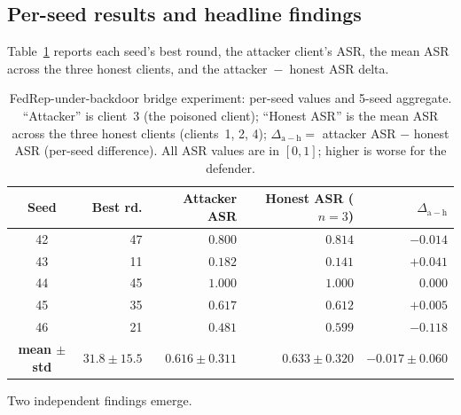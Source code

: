 \documentclass[a4paper,fleqn,doubleblind]{cas-sc}
\newcommand{\tblhead}{\rowcolor{tblHeadBg}}
\newcommand{\zebra}{\rowcolors{2}{tblAltBg}{white}}
\newcommand{\tblhead}{}
\newcommand{\zebra}{}
\begin{document}
\subsection{Per-seed results and headline findings}
\label{sec:bridge-results}

Table~\ref{tab:bridge} reports each seed's best round, the attacker
client's ASR, the mean ASR across the three honest clients, and the
attacker~$-$~honest ASR delta.

\begin{table}[pos=tbp]
\centering
\footnotesize
\setlength{\tabcolsep}{4pt}
\renewcommand{\arraystretch}{1.15}
\caption{FedRep-under-backdoor bridge experiment: per-seed values
and 5-seed aggregate. ``Attacker'' is client~3 (the poisoned
client); ``Honest ASR'' is the mean ASR across the three honest
clients (clients~1, 2, 4);
$\Delta_{\mathrm{a-h}} = $ attacker ASR $-$ honest ASR (per-seed
difference). All ASR values are in $[0, 1]$; higher is worse for
the defender.}
\label{tab:bridge}
\zebra
\begin{tabular}{@{}crrrr@{}}
\toprule
\tblhead
Seed & Best rd. & Attacker ASR & Honest ASR ($n{=}3$) & $\Delta_{\mathrm{a-h}}$ \\
\midrule
42 & 47 & $0.800$ & $0.814$ & $-0.014$ \\
43 & 11 & $0.182$ & $0.141$ & $+0.041$ \\
44 & 45 & $1.000$ & $1.000$ & $\phantom{-}0.000$ \\
45 & 35 & $0.617$ & $0.612$ & $+0.005$ \\
46 & 21 & $0.481$ & $0.599$ & $-0.118$ \\
\midrule
\textbf{mean $\pm$ std} & $\mathbf{31.8 \pm 15.5}$ & $\mathbf{0.616 \pm 0.311}$ & $\mathbf{0.633 \pm 0.320}$ & $\mathbf{-0.017 \pm 0.060}$ \\
\bottomrule
\end{tabular}
\end{table}

Two independent findings emerge.
\end{document}
